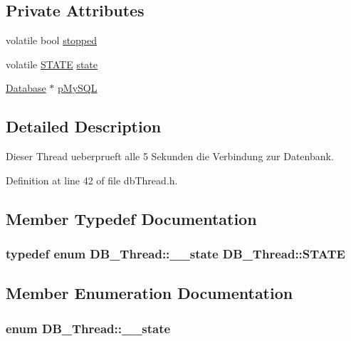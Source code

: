 \subsection*{Private Attributes}
\begin{CompactItemize}
\item 
volatile bool \hyperlink{class_d_b___thread_31c37537c9902c0ebf175b2a35ec965f}{stopped}
\item 
volatile \hyperlink{class_d_b___thread_a70b1b8bfaf0d6b88c1284b947234b5e}{STATE} \hyperlink{class_d_b___thread_9b38f026919bb5a09dd2e8af8e0feef7}{state}
\item 
\hyperlink{class_database}{Database} $\ast$ \hyperlink{class_d_b___thread_e4deb0ec2f72fb944aabb8015b678954}{pMySQL}
\end{CompactItemize}


\subsection{Detailed Description}
Dieser Thread ueberprueft alle 5 Sekunden die Verbindung zur Datenbank. 

Definition at line 42 of file dbThread.h.

\subsection{Member Typedef Documentation}
\hypertarget{class_d_b___thread_a70b1b8bfaf0d6b88c1284b947234b5e}{
\subsubsection[STATE]{\setlength{\rightskip}{0pt plus 5cm}typedef enum {\bf DB\_\-Thread::\_\-\_\-state} {\bf DB\_\-Thread::STATE}}}
\label{class_d_b___thread_a70b1b8bfaf0d6b88c1284b947234b5e}




\subsection{Member Enumeration Documentation}
\hypertarget{class_d_b___thread_056b06b7057fe2d2c90640629908d067}{
\subsubsection[\_\-\_\-state]{\setlength{\rightskip}{0pt plus 5cm}enum {\bf DB\_\-Thread::\_\-\_\-state}}}
\label{class_d_b___thread_056b06b7057fe2d2c90640629908d067}


